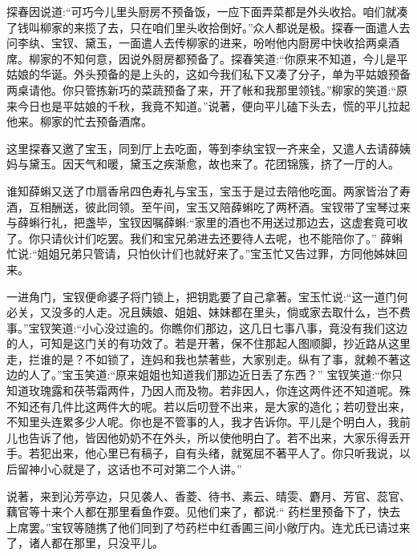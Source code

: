 \begin{parag}
    探春因说道:“可巧今儿里头厨房不预备饭，一应下面弄菜都是外头收拾。咱们就凑了钱叫柳家的来揽了去，只在咱们里头收拾倒好。”众人都说是极。探春一面遣人去问李纨、宝钗、黛玉，一面遣人去传柳家的进来，吩咐他内厨房中快收拾两桌酒席。柳家的不知何意，因说外厨房都预备了。探春笑道:“你原来不知道，今儿是平姑娘的华诞。外头预备的是上头的，这如今我们私下又凑了分子，单为平姑娘预备两桌请他。你只管拣新巧的菜蔬预备了来，开了帐和我那里领钱。”柳家的笑道:“原来今日也是平姑娘的千秋，我竟不知道。”说著，便向平儿磕下头去，慌的平儿拉起他来。柳家的忙去预备酒席。
\end{parag}


\begin{parag}
    这里探春又邀了宝玉，同到厅上去吃面，等到李纨宝钗一齐来全，又遣人去请薛姨妈与黛玉。因天气和暖，黛玉之疾渐愈，故也来了。花团锦簇，挤了一厅的人。
\end{parag}


\begin{parag}
    谁知薛蝌又送了巾扇香帛四色寿礼与宝玉，宝玉于是过去陪他吃面。两家皆治了寿酒，互相酬送，彼此同领。至午间，宝玉又陪薛蝌吃了两杯酒。宝钗带了宝琴过来与薛蝌行礼，把盏毕，宝钗因嘱薛蝌:“家里的酒也不用送过那边去，这虚套竟可收了。你只请伙计们吃罢。我们和宝兄弟进去还要待人去呢，也不能陪你了。” 薛蝌忙说:“姐姐兄弟只管请，只怕伙计们也就好来了。”宝玉忙又告过罪，方同他姊妹回来。
\end{parag}


\begin{parag}
    一进角门，宝钗便命婆子将门锁上，把钥匙要了自己拿著。宝玉忙说:“这一道门何必关，又没多的人走。况且姨娘、姐姐、妹妹都在里头，倘或家去取什么，岂不费事。”宝钗笑道:“小心没过逾的。你瞧你们那边，这几日七事八事，竟没有我们这边的人，可知是这门关的有功效了。若是开著，保不住那起人图顺脚，抄近路从这里走，拦谁的是？不如锁了，连妈和我也禁著些，大家别走。纵有了事，就赖不著这边的人了。”宝玉笑道:“原来姐姐也知道我们那边近日丢了东西？” 宝钗笑道:“你只知道玫瑰露和茯苓霜两件，乃因人而及物。若非因人，你连这两件还不知道呢。殊不知还有几件比这两件大的呢。若以后叨登不出来，是大家的造化；若叨登出来，不知里头连累多少人呢。你也是不管事的人，我才告诉你。平儿是个明白人，我前儿也告诉了他，皆因他奶奶不在外头，所以使他明白了。若不出来，大家乐得丢开手。若犯出来，他心里已有稿子，自有头绪，就冤屈不著平人了。你只听我说，以后留神小心就是了，这话也不可对第二个人讲。”
\end{parag}


\begin{parag}
    说著，来到沁芳亭边，只见袭人、香菱、待书、素云、晴雯、麝月、芳官、蕊官、藕官等十来个人都在那里看鱼作耍。见他们来了，都说:“ 药栏里预备下了，快去上席罢。”宝钗等随携了他们同到了芍药栏中红香圃三间小敞厅内。连尤氏已请过来了，诸人都在那里，只没平儿。
\end{parag}


